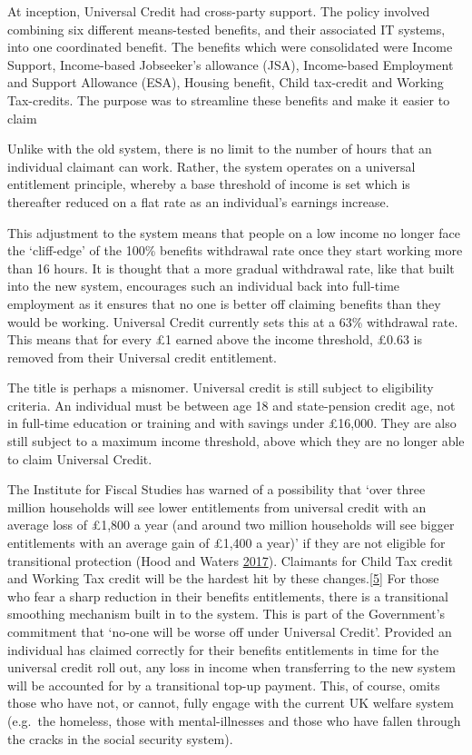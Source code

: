 \documentclass[]{tufte-handout}
\begin{document}
At inception, Universal Credit had cross-party support. The policy
involved combining six different means-tested benefits, and their
associated IT systems, into one coordinated benefit. The benefits which
were consolidated were Income Support, Income-based Jobseeker's
allowance (JSA), Income-based Employment and Support Allowance (ESA),
Housing benefit, Child tax-credit and Working Tax-credits. The purpose
was to streamline these benefits and make it easier to claim

Unlike with the old system, there is no limit to the number of hours
that an individual claimant can work. Rather, the system operates on a
universal entitlement principle, whereby a base threshold of income is
set which is thereafter reduced on a flat rate as an individual's
earnings increase.

This adjustment to the system means that people on a low income no
longer face the `cliff-edge' of the 100\% benefits withdrawal rate once
they start working more than 16 hours. It is thought that a more gradual
withdrawal rate, like that built into the new system, encourages such an
individual back into full-time employment as it ensures that no one is
better off claiming benefits than they would be working. Universal
Credit currently sets this at a 63\% withdrawal rate. This means that
for every £1 earned above the income threshold, £0.63 is removed from
their Universal credit entitlement.

The title is perhaps a misnomer. Universal credit is still subject to
eligibility criteria. An individual must be between age 18 and
state-pension credit age, not in full-time education or training and
with savings under £16,000. They are also still subject to a maximum
income threshold, above which they are no longer able to claim Universal
Credit.

The Institute for Fiscal Studies has warned of a possibility that `over
three million households will see lower entitlements from universal
credit with an average loss of £1,800 a year (and around two million
households will see bigger entitlements with an average gain of £1,400 a
year)' if they are not eligible for transitional protection (Hood and
Waters \protect\hyperlink{ref-Hood2017}{2017}). Claimants for Child Tax
credit and Working Tax credit will be the hardest hit by these
changes.{[}\protect\hyperlink{_ftn5}{5{]}} For those who fear a sharp
reduction in their benefits entitlements, there is a transitional
smoothing mechanism built in to the system. This is part of the
Government's commitment that `no-one will be worse off under Universal
Credit'. Provided an individual has claimed correctly for their benefits
entitlements in time for the universal credit roll out, any loss in
income when transferring to the new system will be accounted for by a
transitional top-up payment. This, of course, omits those who have not,
or cannot, fully engage with the current UK welfare system (e.g.~the
homeless, those with mental-illnesses and those who have fallen through
the cracks in the social security system).
\end{document}
